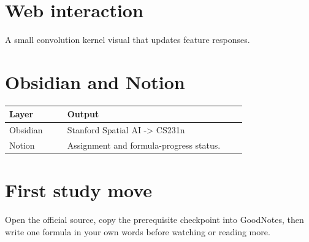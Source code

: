 \documentclass[11pt]{article}
\begin{document}
\section*{Web interaction}
A small convolution kernel visual that updates feature responses.

\section*{Obsidian and Notion}
\begin{tabular}{p{0.22\linewidth}p{0.68\linewidth}}
\toprule
Layer & Output \\
\midrule
Obsidian & Stanford Spatial AI -> CS231n \\
Notion & Assignment and formula-progress status. \\
\bottomrule
\end{tabular}

\section*{First study move}
Open the official source, copy the prerequisite checkpoint into GoodNotes, then write one formula in your own words before watching or reading more.
\end{document}
